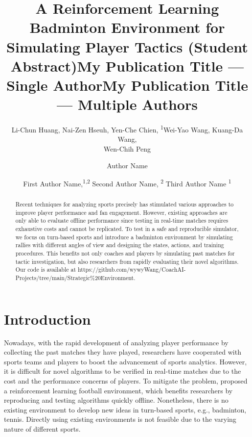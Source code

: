 \documentclass[letterpaper]{article} %
\title{A Reinforcement Learning Badminton Environment for Simulating Player Tactics (Student Abstract)}
\author {
    Li-Chun Huang,
    Nai-Zen Hseuh,
    Yen-Che Chien,
    \textsuperscript{\rm 1}Wei-Yao Wang,
    Kuang-Da Wang, \\
    Wen-Chih Peng
}
\title{My Publication Title --- Single Author}
\author {
    Author Name
}
\title{My Publication Title --- Multiple Authors}
\author {
    First Author Name,\textsuperscript{\rm 1,\rm 2}
    Second Author Name, \textsuperscript{\rm 2}
    Third Author Name \textsuperscript{\rm 1}
}
\begin{document}
\maketitle

\begin{abstract}
Recent techniques for analyzing sports precisely has stimulated various approaches to improve player performance and fan engagement.
However, existing approaches are only able to evaluate offline performance since testing in real-time matches requires exhaustive costs and cannot be replicated.
To test in a safe and reproducible simulator, we focus on turn-based sports and introduce a badminton environment by simulating rallies with different angles of view and designing the states, actions, and training procedures.
This benefits not only coaches and players by simulating past matches for tactic investigation, but also researchers from rapidly evaluating their novel algorithms.
Our code is available at https://github.com/wywyWang/CoachAI-Projects/tree/main/Strategic\%20Environment.
\end{abstract}

\section{Introduction}
Nowadays, with the rapid development of analyzing player performance by collecting the past matches they have played, researchers have cooperated with sports teams and players to boost the advancement of sports analytics.
However, it is difficult for novel algorithms to be verified in real-time matches due to the cost and the performance concerns of players.
To mitigate the problem, \citet{DBLP:conf/aaai/KurachRSZBERVMB20} proposed a reinforcement learning football environment, which benefits researchers by reproducing and testing algorithms quickly offline.
Nonetheless, there is no existing environment to develop new ideas in turn-based sports, e.g., badminton, tennis.
Directly using existing environments is not feasible due to the varying nature of different sports.
\end{document}
